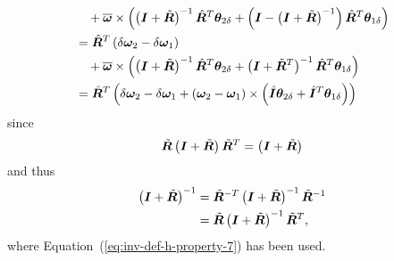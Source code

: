 \documentclass[10pt,dvips,fleqn,subeqn]{report}
\newcommand{\T}[1]{\bm{#1}}
\begin{document}
\begin{align}
	& \mbox{\hspace{10pt}} + \overline{\T{\omega}} \times \plbr{
		\plbr{\T{I} + \tilde{\T{R}}}^{-1} \hat{\T{R}}^T \T{\theta}_{2\delta}
		+ \plbr{\T{I} - \plbr{\T{I} + \tilde{\T{R}}}^{-1}} \hat{\T{R}}^T \T{\theta}_{1\delta}
	} \nonumber \\
	&= \hat{\T{R}}^T \plbr{
		\delta\T{\omega}_2 - \delta\T{\omega}_1
	} \nonumber \\
	& \mbox{\hspace{10pt}} + \overline{\T{\omega}} \times \plbr{
		\plbr{\T{I} + \tilde{\T{R}}}^{-1} \hat{\T{R}}^T \T{\theta}_{2\delta}
		+ \plbr{\T{I} + \tilde{\T{R}}^T}^{-1} \hat{\T{R}}^T \T{\theta}_{1\delta}
	} \nonumber \\
	&= \hat{\T{R}}^T \plbr{
		\delta\T{\omega}_2 - \delta\T{\omega}_1
	+ \plbr{\T{\omega}_2 - \T{\omega}_1} \times \plbr{
		\hat{\T{I}} \T{\theta}_{2\delta}
		+ \hat{\T{I}}^T \T{\theta}_{1\delta}
	}}
	\label{eq:inv-deformable-hinge-omega-rel-delta}
\end{align}
since
\begin{equation}
	\tilde{\T{R}}\plbr{\T{I} + \tilde{\T{R}}} \tilde{\T{R}}^T = \plbr{\T{I} + \tilde{\T{R}}}
\end{equation}
and thus
\begin{align}
	\plbr{\T{I} + \tilde{\T{R}}}^{-1}
	&= \tilde{\T{R}}^{-T} \plbr{\T{I} + \tilde{\T{R}}}^{-1} \tilde{\T{R}}^{-1} \nonumber \\
	&= \tilde{\T{R}} \plbr{\T{I} + \tilde{\T{R}}}^{-1} \tilde{\T{R}}^T ,
\end{align}
where Equation~(\ref{eq:inv-def-h-property-7}) has been used.
\end{document}
